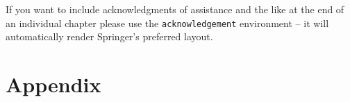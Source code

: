 \documentclass[graybox]{svmult}
\begin{document}



\begin{acknowledgement}
If you want to include acknowledgments of assistance and the like at the end of an individual chapter please use the \verb|acknowledgement| environment -- it will automatically render Springer's preferred layout.
\end{acknowledgement}
%
\section*{Appendix}





%


%
\end{document}
